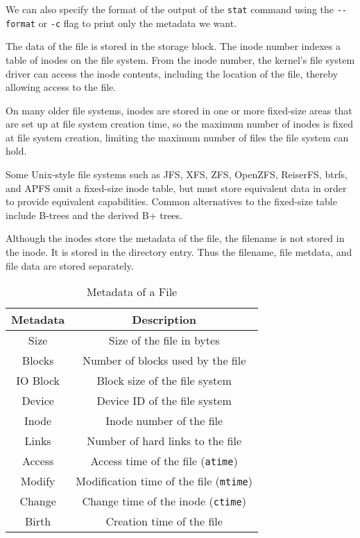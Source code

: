 We can also specify the format of the output of the \lstinline|stat| command using the \lstinline|--format| or \lstinline|-c| flag to print only the metadata we want.

The data of the file is stored in the storage block.
The inode number indexes a table of inodes on the file system.
From the inode number, the kernel's file system driver can access the inode contents, including the location of the file, thereby allowing access to the file.

On many older file systems, inodes are stored in one or more fixed-size areas that are set up at file system creation time, so the maximum number of inodes is fixed at file system creation, limiting the maximum number of files the file system can hold.

Some Unix-style file systems such as JFS, XFS, ZFS, OpenZFS, ReiserFS, btrfs, and APFS omit a fixed-size inode table, but must store equivalent data in order to provide equivalent capabilities. Common alternatives to the fixed-size table include B-trees and the derived B+ trees.

\begin{remark}
  Although the inodes store the metadata of the file, the filename is not stored in the inode.
  It is stored in the directory entry.
  Thus the filename, file metdata, and file data are stored separately.
\end{remark}

\begin{table}
\caption{Metadata of a File}
\begin{tabular}{ c c }
  \toprule
  Metadata & Description \\
 \midrule
  Size & Size of the file in bytes \\
  Blocks & Number of blocks used by the file \\
  IO Block & Block size of the file system \\
  Device & Device ID of the file system \\
  Inode & Inode number of the file \\
  Links & Number of hard links to the file \\
  Access & Access time of the file (\lstinline|atime|) \\
  Modify & Modification time of the file (\lstinline|mtime|) \\
  Change & Change time of the inode (\lstinline|ctime|) \\
  Birth & Creation time of the file \\
 \bottomrule
 \end{tabular}
\end{table}


